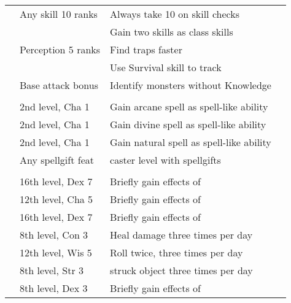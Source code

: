 {\begin{longtabu}{>{\lcol}p{10em} >{\lcol}p{15em} >{\lcol}X >{\lcol}p{3em}}
 & Any skill 10 ranks & Always take 10 on skill checks &  \\
 & \x & Gain two skills as class skills &  \\
 & Perception 5 ranks & Find traps faster &  \\
 & \x &  Use Survival skill to track &  \\
 & Base attack bonus  & Identify monsters without Knowledge &  \\

\midrule
{} &  &  &  \\
 & 2nd level, Cha 1 & Gain arcane spell as spell-like ability &  \\
 & 2nd level, Cha 1 & Gain divine spell as spell-like ability &  \\
 & 2nd level, Cha 1 & Gain natural spell as spell-like ability &  \\
 & Any spellgift feat &  caster level with spellgifts &  \\

\midrule
{} &  &  &  \\
 & 16th level, Dex 7 & Briefly gain effects of  &  \\
 & 12th level, Cha 5 & Briefly gain effects of  &  \\
 & 16th level, Dex 7 & Briefly gain effects of  &  \\
 & 8th level, Con 3 & Heal damage three times per day &  \\
 & 12th level, Wis 5 & Roll twice, three times per day &  \\
 & 8th level, Str 3 &  struck object three times per day &  \\
 & 8th level, Dex 3 & Briefly gain effects of  &  \\
\end{longtabu}}

